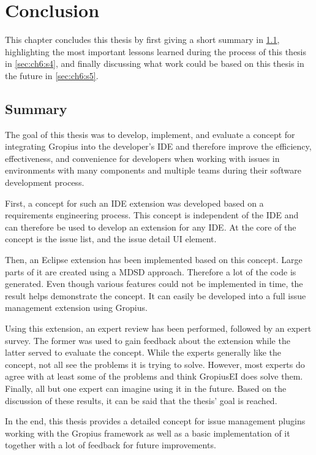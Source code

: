 
\chapter{Conclusion}
\label{chap:ch6}
This chapter concludes this thesis by first giving a short summary in \cref{sec:ch6:s1}, highlighting the most important lessons learned during the process of this thesis in \cref{sec:ch6:s4}, and finally discussing what work could be based on this thesis in the future in \cref{sec:ch6:s5}.

\section{Summary}
\label{sec:ch6:s1}
The goal of this thesis was to develop, implement, and evaluate a concept for integrating \gls{Gropius} into the developer's \gls{IDE} and therefore improve the efficiency, effectiveness, and convenience for developers when working with issues in environments with many components and multiple teams during their software development process.

First, a concept for such an \gls{IDE} extension was developed based on a requirements engineering process.
This concept is independent of the \gls{IDE} and can therefore be used to develop an extension for any \gls{IDE}.
At the core of the concept is the issue list, and the issue detail \gls{UI} element.

Then, an \gls{Eclipse} extension has been implemented based on this concept.
Large parts of it are created using a \gls{MDSD} approach. Therefore a lot of the code is generated.
Even though various features could not be implemented in time, the result helps demonstrate the concept.
It can easily be developed into a full issue management extension using \gls{Gropius}.

Using this extension, an expert review has been performed, followed by an expert survey.
The former was used to gain feedback about the extension while the latter served to evaluate the concept.
While the experts generally like the concept, not all see the problems it is trying to solve.
However, most experts do agree with at least some of the problems and think \gls{GropiusEI} does solve them.
Finally, all but one expert can imagine using it in the future.
Based on the discussion of these results, it can be said that the thesis' goal is reached.

In the end, this thesis provides a detailed concept for issue management plugins working with the \gls{Gropius} framework as well as a basic implementation of it together with a lot of feedback for future improvements.

